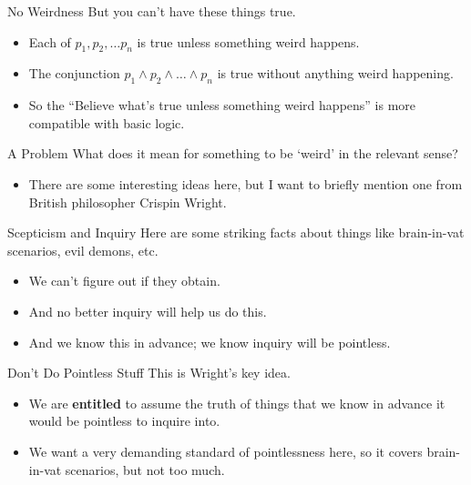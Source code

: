\documentclass[
  17pt,
  letterpaper,
  ignorenonframetext,
  aspectratio=169,
]{beamer}
\providecommand{\tightlist}{%
  \setlength{\itemsep}{0pt}\setlength{\parskip}{0pt}}\usepackage{longtable,booktabs,array}
\begin{document}
\begin{frame}{No Weirdness}
\protect\hypertarget{no-weirdness}{}
But you can't have these things true.

\begin{itemize}[<+->]
\tightlist
\item
  Each of \(p_1, p_2, \dots p_n\) is true unless something weird
  happens.
\item
  The conjunction \(p_1 \wedge p_2 \wedge \dots \wedge p_n\) is true
  without anything weird happening.
\item
  So the ``Believe what's true unless something weird happens'' is more
  compatible with basic logic.
\end{itemize}
\end{frame}

\begin{frame}{A Problem}
\protect\hypertarget{a-problem}{}
What does it mean for something to be `weird' in the relevant sense?

\begin{itemize}[<+->]
\tightlist
\item
  There are some interesting ideas here, but I want to briefly mention
  one from British philosopher Crispin Wright.
\end{itemize}
\end{frame}

\begin{frame}{Scepticism and Inquiry}
\protect\hypertarget{scepticism-and-inquiry}{}
Here are some striking facts about things like brain-in-vat scenarios,
evil demons, etc.

\begin{itemize}[<+->]
\tightlist
\item
  We can't figure out if they obtain.
\item
  And no better inquiry will help us do this.
\item
  And we know this in advance; we know inquiry will be pointless.
\end{itemize}
\end{frame}

\begin{frame}{Don't Do Pointless Stuff}
\protect\hypertarget{dont-do-pointless-stuff}{}
This is Wright's key idea.

\begin{itemize}[<+->]
\tightlist
\item
  We are \textbf{entitled} to assume the truth of things that we know in
  advance it would be pointless to inquire into.
\item
  We want a very demanding standard of pointlessness here, so it covers
  brain-in-vat scenarios, but not too much.
\end{itemize}
\end{frame}
\end{document}
